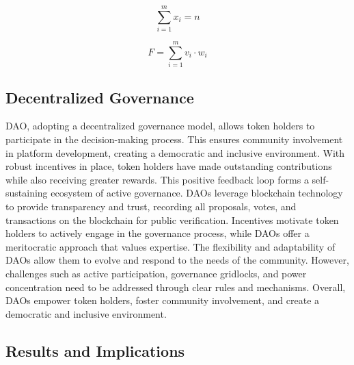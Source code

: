 \documentclass[lettersize,journal]{IEEEtran}
\begin{document}
\begin{equation}
  \sum_{i = 1}^{m}x_i = n
\end{equation}

\begin{equation}
  F = \sum_{i = 1}^{m}v_i \cdot w_i
\end{equation}


\subsection{Decentralized Governance}

DAO, adopting a decentralized governance model, allows token holders to participate in the decision-making process. This ensures community involvement in platform development, creating a democratic and inclusive environment. With robust incentives in place, token holders have made outstanding contributions while also receiving greater rewards. This positive feedback loop forms a self-sustaining ecosystem of active governance. DAOs leverage blockchain technology to provide transparency and trust, recording all proposals, votes, and transactions on the blockchain for public verification. Incentives motivate token holders to actively engage in the governance process, while DAOs offer a meritocratic approach that values expertise. The flexibility and adaptability of DAOs allow them to evolve and respond to the needs of the community. However, challenges such as active participation, governance gridlocks, and power concentration need to be addressed through clear rules and mechanisms. Overall, DAOs empower token holders, foster community involvement, and create a democratic and inclusive environment.

\subsection{Results and Implications}
\end{document}

